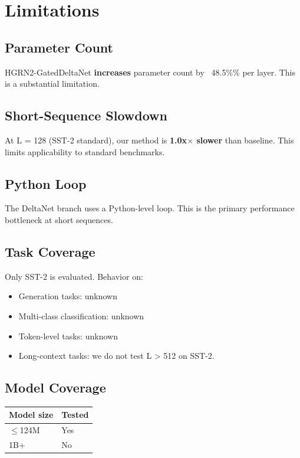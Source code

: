 \section{Limitations}

\subsection{Parameter Count}

HGRN2-GatedDeltaNet \textbf{increases} parameter count by ~48.5\%\% per 
layer. This is a substantial limitation.

\subsection{Short-Sequence Slowdown}

At L = 128 (SST-2 standard), our method is \textbf{1.0x$\times$ slower} than 
baseline. This limits applicability to standard benchmarks.

\subsection{Python Loop}

The DeltaNet branch uses a Python-level loop. This is the primary 
performance bottleneck at short sequences.

\subsection{Task Coverage}

Only SST-2 is evaluated. Behavior on:
\begin{itemize}
\item Generation tasks: unknown
\item Multi-class classification: unknown
\item Token-level tasks: unknown
\item Long-context tasks: we do not test L \textgreater{} 512 on SST-2.

\end{itemize}
\subsection{Model Coverage}

\begin{table}[H]
\centering
\small
\begin{tabular}{ll}
\toprule
\textbf{Model size} & \textbf{Tested} \\
\midrule
$\le$124M & Yes \\
1B+ & No \\
\bottomrule
\end{tabular}
\end{table}

